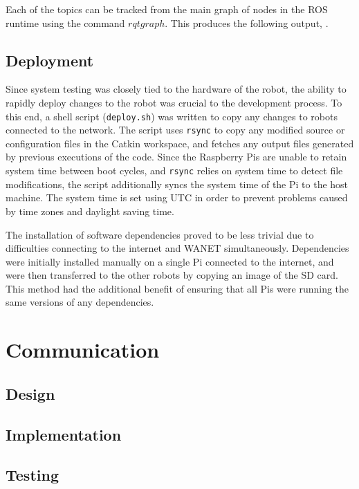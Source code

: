 Each of the topics can be tracked from the main graph of nodes in the ROS runtime using the command $rqt graph$. This produces the following output, .


\subsection{Deployment}\label{soft/ROS/deploy}
Since system testing was closely tied to the hardware of the robot, the ability to rapidly deploy changes to the robot was crucial to the development process. To this end, a shell script (\verb|deploy.sh|) was written to copy any changes to robots connected to the network. The script uses \verb|rsync| to copy any modified source or configuration files in the Catkin workspace, and fetches any output files generated by previous executions of the code. Since the Raspberry Pis are unable to retain system time between boot cycles, and \verb|rsync| relies on system time to detect file modifications, the script additionally syncs the system time of the Pi to the host machine. The system time is set using UTC in order to prevent problems caused by time zones and daylight saving time.

The installation of software dependencies proved to be less trivial due to difficulties connecting to the internet and WANET simultaneously. Dependencies were initially installed manually on a single Pi connected to the internet, and were then transferred to the other robots by copying an image of the SD card. This method had the additional benefit of ensuring that all Pis were running the same versions of any dependencies.


\section{Communication}\label{soft/comms}

\subsection{Design}\label{soft/comms/design}

\subsection{Implementation}\label{soft/comms/impl}

\subsection{Testing}\label{soft/comms/test}




